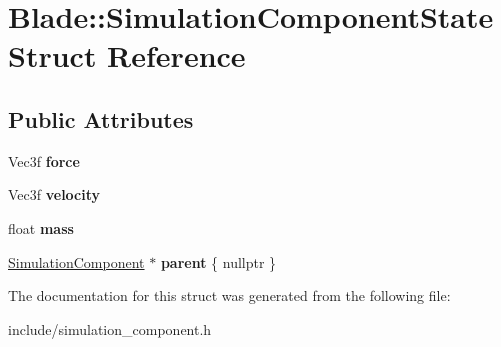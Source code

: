 \hypertarget{struct_blade_1_1_simulation_component_state}{}\section{Blade\+:\+:Simulation\+Component\+State Struct Reference}
\label{struct_blade_1_1_simulation_component_state}
\subsection*{Public Attributes}
\begin{DoxyCompactItemize}
\item 
\mbox{\label{struct_blade_1_1_simulation_component_state_ac741f0c73cf76b26164b883da5943697}} 
Vec3f {\bfseries force}
\item 
\mbox{\label{struct_blade_1_1_simulation_component_state_a021569c2494d99c0c0221f42838ca7a2}} 
Vec3f {\bfseries velocity}
\item 
\mbox{\label{struct_blade_1_1_simulation_component_state_aec212c914a15a02a85823cfcdb3c4e9f}} 
float {\bfseries mass}
\item 
\mbox{\label{struct_blade_1_1_simulation_component_state_ab164f1b6dcc47f279a4ee32516925238}} 
\hyperlink{class_blade_1_1_simulation_component}{Simulation\+Component} $\ast$ {\bfseries parent} \{ nullptr \}
\end{DoxyCompactItemize}


The documentation for this struct was generated from the following file\+:\begin{DoxyCompactItemize}
\item 
include/simulation\+\_\+component.\+h\end{DoxyCompactItemize}
